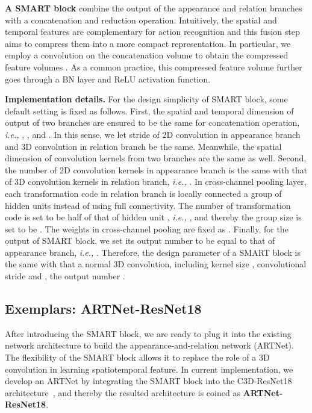 \documentclass[10pt,twocolumn,letterpaper]{article}
\begin{document}
{\bf A SMART block} combine the output of the appearance and relation branches with a concatenation and reduction operation. Intuitively, the spatial and temporal features are complementary for action recognition and this fusion step aims to compress them into a more compact representation. In particular, we employ a  convolution on the concatenation volume  to obtain the compressed feature volumes . As a common practice, this compressed feature volume  further goes through a BN layer and ReLU activation function.

{\bf Implementation details.} For the design simplicity of SMART block, some default setting is fixed as follows. First, the spatial and temporal dimension of output of two branches are ensured to be the same for concatenation operation, {\em i.e.,} , , and . In this sense, we let stride of 2D convolution in appearance branch and 3D convolution in relation branch be the same. Meanwhile, the spatial dimension of convolution kernels from two branches are the same as well. Second, the number of 2D convolution kernels in appearance branch is the same with that of 3D convolution kernels in relation branch, {\em i.e.,} . In cross-channel pooling layer, each transformation code  in relation branch is locally connected a group of hidden units instead of using full connectivity. The number of transformation code is set to be half of that of hidden unit , {\em i.e.,} , and thereby the group size is set to be . The weights in cross-channel pooling are fixed as . Finally, for the output of SMART block, we set its output number to be equal to that of appearance branch, {\em i.e.,} . Therefore, the design parameter of a SMART block is the same with that a normal 3D convolution, including kernel size , convolutional stride  and , the output number .

\subsection{Exemplars: ARTNet-ResNet18}

After introducing the SMART block, we are ready to plug it into the existing network architecture to build the appearance-and-relation network (ARTNet). The flexibility of the SMART block allows it to replace the role of a 3D convolution in learning spatiotemporal feature. In current implementation, we develop an ARTNet by integrating the SMART block into the C3D-ResNet18 architecture~\cite{Tran17}, and thereby the resulted architecture is coined as {\bf ARTNet-ResNet18}. 
\end{document}
